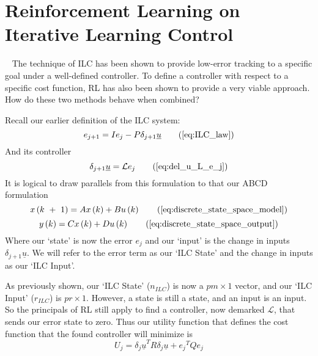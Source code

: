 \section{Reinforcement Learning on Iterative Learning Control}
~\label{sec:rl_on_ilc}
The technique of ILC has been shown to provide low-error tracking to a specific goal under a well-defined controller. To define a controller with respect to a specific cost function, RL has also been shown to provide a very viable approach. How do these two methods behave when combined?

Recall our earlier definition of the ILC system:
\begin{equation}
	e_{j+1}=Ie_j-P\delta_{j+1}\underline{u}
    \tag{\ref{eq:ILC_law}}
\end{equation}
And its controller
\begin{equation}
	\delta_{j+1}\underline{u}=\mathcal{L}e_j
    \tag{\ref{eq:del_u_L_e_j}}
\end{equation}
It is logical to draw parallels from this formulation to that our ABCD formulation
\begin{equation}
    x\left(k\ +\ 1\right)=Ax\left(k\right)+Bu\left(k\right)
    \tag{\ref{eq:discrete_state_space_model}}
\end{equation}
\begin{equation}
    y\left(k\right)=Cx\left(k\right)+Du\left(k\right)
    \tag{\ref{eq:discrete_state_space_output}}
\end{equation}
Where our `state' is now the error $e_j$ and our `input' is the change in inputs $\delta_{j+1}\underline{u}$. We will refer to the error term as our `ILC State' and the change in inputs as our `ILC Input'. 

As previously shown, our `ILC State' ($n_{ILC}$) is now a $pm \times1$ vector, and our `ILC Input' ($r_{ILC}$) is $pr \times1$. However, a state is still a state, and an input is an input. So the principals of RL still apply to find a controller, now demarked $\mathcal{L}$, that sends our error state to zero. Thus our utility function that defines the cost function that the found controller will minimize is
\begin{equation}
    U_j = {\delta_j \underline{u}}^T R {\delta_j \underline{u}} + {e_j}^T Q {e_j}
    \label{eq:ilc_utility}
\end{equation}

